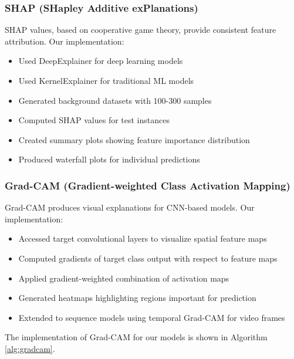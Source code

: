 \documentclass[conference,compsoc]{IEEEtran}
\begin{document}
\subsubsection{SHAP (SHapley Additive exPlanations)}
SHAP values, based on cooperative game theory, provide consistent feature attribution. Our implementation:
\begin{itemize}
    \item Used DeepExplainer for deep learning models
    \item Used KernelExplainer for traditional ML models
    \item Generated background datasets with 100-300 samples
    \item Computed SHAP values for test instances
    \item Created summary plots showing feature importance distribution
    \item Produced waterfall plots for individual predictions
\end{itemize}

\subsubsection{Grad-CAM (Gradient-weighted Class Activation Mapping)}
Grad-CAM produces visual explanations for CNN-based models. Our implementation:
\begin{itemize}
    \item Accessed target convolutional layers to visualize spatial feature maps
    \item Computed gradients of target class output with respect to feature maps
    \item Applied gradient-weighted combination of activation maps
    \item Generated heatmaps highlighting regions important for prediction
    \item Extended to sequence models using temporal Grad-CAM for video frames
\end{itemize}

The implementation of Grad-CAM for our models is shown in Algorithm \ref{alg:gradcam}.
\end{document}
